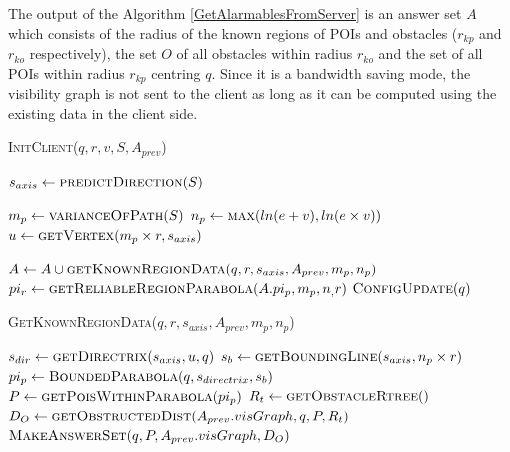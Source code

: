 The output of the Algorithm \ref{GetAlarmablesFromServer} is an answer set $A$ which consists of the radius of the known regions of POIs and obstacles ($r_{kp}$ and $r_{ko}$ respectively), the set $O$ of all obstacles within radius $r_{ko}$ and the set of all POIs within radius $r_{kp}$ centring $q$. Since it is a bandwidth saving mode, the visibility graph is not sent to the client as long as it can be computed using the existing data in the client side.\\

\begin{algorithm}
\caption{\textsc{InitClient}($q, r, v, S, A_{prev}$)}
\label{InitClient}


   
    
	 $s_{axis} \gets \textsc{predictDirection}(S)$ \;
	
	 $m_p \gets \textsc{varianceOfPath}(S)$ \;
	 $n_p \gets \textsc{max}( ln( e + v ),ln(e\times v))$ \;
	 $u \gets \textsc{getVertex}(m_p \times r, s_{axis})$ \;
	
	
	 $A \gets A \cup \textsc{getKnownRegionData}(q, r, s_{axis}, A_{prev}, m_p, n_p)$ \;
	 $pi_r \gets \textsc{getReliableRegionParabola}(A.pi_p,m_p,n_,r)$ \;
	$ \textsc{ConfigUpdate}(q)$\;
	 

\end{algorithm}
\vspace{5pt}
\begin{algorithm}
\caption{\textsc{GetKnownRegionData}($q, r, s_{axis}, A_{prev}, m_p, n_p$)}
\label{getKnownRegionData}

$s_{dir} \gets \textsc{getDirectrix}(s_{axis},u,q)$\;
$s_b \gets \textsc{getBoundingLine}(s_{axis},n_p \times r) $\;
$pi_p \gets \textsc{BoundedParabola}( q, s_{directrix},  s_b)$\;
$P \gets \textsc{getPoisWithinParabola}( pi_p )$\;
  $ R_t \gets \textsc{getObstacleRtree}()$\;
  $ D_O \gets \textsc{getObstructedDist}(A_{prev}.visGraph, q, P, R_t) $\;
\Return $\textsc{MakeAnswerSet}(q, P, A_{prev}.visGraph, D_O )  $
\end{algorithm}
